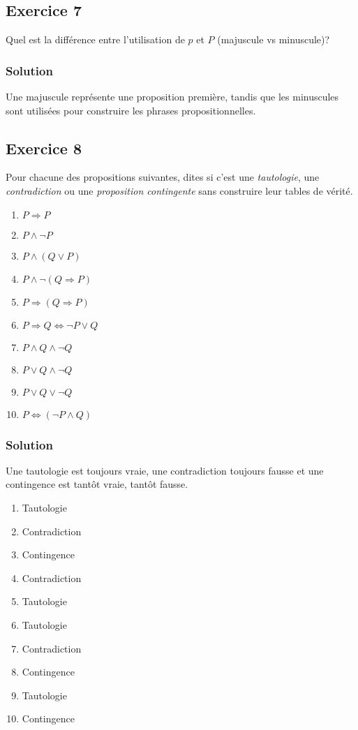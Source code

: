 \subsection*{Exercice 7}
Quel est la différence entre l'utilisation de $p$ et $P$ (majuscule vs minuscule)?


\subsubsection*{Solution}
    Une majuscule représente une proposition première, tandis que les minuscules sont utilisées pour construire les phrases propositionnelles.\\

\subsection*{Exercice 8}
Pour chacune des propositions suivantes, dites si c'est une
\textit{tautologie}, une \textit{contradiction} ou une \textit{proposition contingente}
sans construire leur tables de vérité.
\begin{enumerate}
	\item $P \Rightarrow P$
	\item $P \land \neg P$
	\item $P \land (Q \lor P)$
	\item $P \land \neg (Q \Rightarrow P)$
	\item $P \Rightarrow (Q \Rightarrow P)$
	\item $P \Rightarrow Q \Leftrightarrow \neg P \lor Q$
	\item $P \land Q \land \neg Q$
	\item $P \lor Q \land \neg Q$
	\item $P \lor Q \lor \neg Q$
	\item $P \Leftrightarrow (\neg P \land Q)$
\end{enumerate}


\subsubsection*{Solution}


    Une tautologie est toujours vraie, une contradiction toujours fausse et une contingence est tantôt vraie, tantôt fausse.

    \begin{enumerate}
        \item Tautologie
        \item Contradiction
        \item Contingence
        \item Contradiction
        \item Tautologie
        \item Tautologie
        \item Contradiction
        \item Contingence
        \item Tautologie
        \item Contingence
    \end{enumerate}
    

